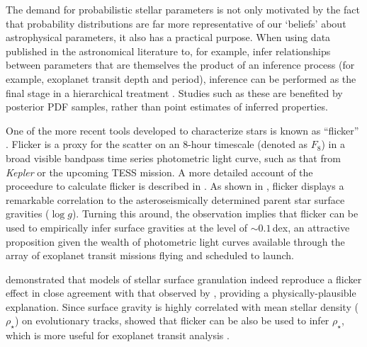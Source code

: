 \documentclass[apjl]{emulateapj}
\newcommand{\logg}{$\log g$}
\newcommand{\rhostar}{$\rho_{\star}$}
\begin{document}
The demand for probabilistic stellar parameters is not only motivated by the
fact that probability distributions are far more representative of our
`beliefs' about astrophysical parameters, it also has a practical purpose.
When using data published in the astronomical literature to, for example,
infer relationships between parameters that are themselves the product of an
inference process (for example, exoplanet transit depth and period), inference
can be performed as the final stage in a hierarchical treatment \citep[see,
e.g.][]{foreman-mackey:2014}.
Studies such as these are benefited by posterior PDF samples, rather than
point estimates of inferred properties.



One of the more recent tools developed to characterize stars is known as
``flicker'' \citep{bastien:2013}.
Flicker is a proxy for the scatter on an 8-hour timescale (denoted as $F_8$)
in a broad visible bandpass time series photometric light curve, such as that
from \textit{Kepler} or the upcoming TESS mission. A more detailed account of
the proceedure to calculate flicker is described in \citet{bastien:2013}. As
shown in \citet{bastien:2013}, flicker displays a remarkable correlation to
the asteroseismically determined parent star surface gravities (\logg).
Turning this around, the observation implies that flicker can be used to
empirically infer surface gravities at the level of $\sim0.1$\,dex, an
attractive proposition given the wealth of photometric light curves available
through the array of exoplanet transit missions flying and scheduled to
launch.

\citet{cranmer:2014} demonstrated that models of stellar surface granulation
indeed reproduce a flicker effect in close agreement with that observed by
\citet{bastien:2013}, providing a physically-plausible explanation.
Since surface gravity is highly correlated with mean stellar density (\rhostar)
on evolutionary tracks, \citet{kipping:2014} showed that flicker can be also
be used to infer \rhostar, which is more useful for exoplanet transit analysis
\citep{seager:2003}.
\end{document}
